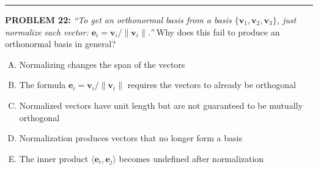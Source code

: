 \documentclass[12pt]{amsart}
\newcommand{\divider}{
  \vspace{-1em} %
  \noindent
  \raisebox{-0.15ex}{\textbullet}%
  \hspace{0.5em}%
  \rule[0.5ex]{0.95\textwidth}{1.0pt}%
  \hspace{0.5em}%
  \raisebox{-0.15ex}{\textbullet}%
  \vspace{0em} %
}
\begin{document}
{%

\divider


{\bf PROBLEM 22:}
% 
{\em ``To get an orthonormal basis from a basis $\{\mathbf{v}_1, \mathbf{v}_2, \mathbf{v}_3\}$, just normalize each vector: $\mathbf{e}_i = \mathbf{v}_i/\|\mathbf{v}_i\|$.''} 
%
Why does this fail to produce an orthonormal basis in general?
%
\begin{enumerate}[(A)]
\item Normalizing changes the span of the vectors
\item The formula $\mathbf{e}_i = \mathbf{v}_i/\|\mathbf{v}_i\|$ requires the vectors to already be orthogonal
\item Normalized vectors have unit length but are not guaranteed to be mutually orthogonal
\item Normalization produces vectors that no longer form a basis
\item The inner product $\langle \mathbf{e}_i, \mathbf{e}_j \rangle$ becomes undefined after normalization
\end{enumerate}


}
\end{document}
